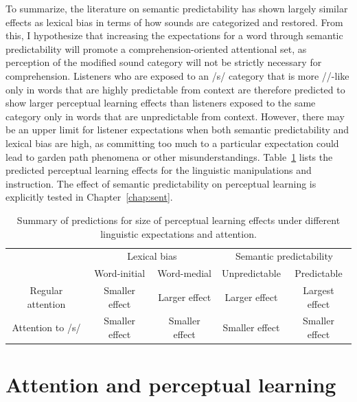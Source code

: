 To summarize, the literature on semantic predictability has shown largely similar effects as lexical bias in terms of how sounds are categorized and restored.  
From this, I hypothesize that increasing the expectations for a word through semantic predictability will promote a comprehension-oriented attentional set, as perception of the modified sound category will not be strictly necessary for comprehension.
Listeners who are exposed to an /s/ category that is more /\textesh/-like only in words that are highly predictable from context are therefore predicted to show larger perceptual learning effects than listeners exposed to the same category only in words that are unpredictable from context.
However, there may be an upper limit for listener expectations when both semantic predictability and lexical bias are high, as committing too much to a particular expectation could lead to garden path phenomena \citep{Levy2008} or other misunderstandings.
Table~\ref{tbl:predictions} lists the predicted perceptual learning effects for the linguistic manipulations and instruction.
The effect of semantic predictability on perceptual learning is explicitly tested in Chapter~\ref{chap:sent}.

\begin{table}[h]
\caption{Summary of predictions for size of perceptual learning effects under different linguistic expectations and attention.}
\label{tbl:predictions}
\centering
\small
\begin{tabular}{cccccc}
\toprule
                  &                   & \multicolumn{2}{c}{Lexical bias} & \multicolumn{2}{c}{Semantic predictability} \\
\cmidrule(r){3-4}
\cmidrule(r){5-6}
                  &                   & Word-initial    & Word-medial    & Unpredictable        & Predictable          \\
\midrule
\multicolumn{2}{c}{Regular attention} & Smaller effect  & Larger effect  & Larger effect       & Largest effect        \\
\multicolumn{2}{c}{Attention to /s/}  & Smaller effect  & Smaller effect & Smaller effect       & Smaller effect  \\
\bottomrule    
\end{tabular}
\end{table}

\section{Attention and perceptual learning}
\label{sec:attention}

